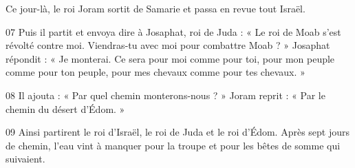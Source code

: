 Ce jour-là, le roi Joram sortit de Samarie et passa en revue tout Israël.

07 Puis il partit et envoya dire à Josaphat, roi de Juda : « Le roi de Moab s’est révolté contre moi. Viendras-tu avec moi pour combattre Moab ? » Josaphat répondit : « Je monterai. Ce sera pour moi comme pour toi, pour mon peuple comme pour ton peuple, pour mes chevaux comme pour tes chevaux. »

08 Il ajouta : « Par quel chemin monterons-nous ? » Joram reprit : « Par le chemin du désert d’Édom. »

09 Ainsi partirent le roi d’Israël, le roi de Juda et le roi d’Édom. Après sept jours de chemin, l’eau vint à manquer pour la troupe et pour les bêtes de somme qui suivaient.
